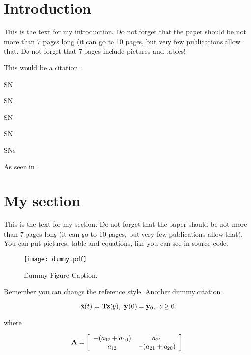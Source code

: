 \section{Introduction}

This is the text for my introduction. Do not forget that the paper should be not more than 7 pages long (it can go to 10 pages, but very few publications allow that. Do not forget that 7 pages include pictures and tables!

This would be a citation \cite{dummy}.

\ac{SN} 

\acf{SN}

\acs{SN}

\acl{SN}

\acp{SN}

As seen in \cite{wiki}.

\section{My section}

This is the text for my section. Do not forget that the paper should be not more than 7 pages long (it can go to 10 pages, but very few publications allow that). You can put pictures, table and equations, like you can see in source code.

\begin{figure}[H]
	\centering
		\texttt{[image: dummy.pdf]}
	\caption[Dummy Figure Caption for List of Figures.]{Dummy Figure Caption.}
	\label{fig:dummyfigure1}
\end{figure}

Remember you can change the reference style. Another dummy citation \cite{site}.

\begin{equation}
\dot{\mathbf{x}}(t) = \mathbf{T}\mathbf{z}(y),\  \mathbf{y}(0) = \mathbf{y}_0,\  z\geq 0 \\
\label{eq:dummyeq1}
\end{equation}

\noindent where

\begin{equation}
\mathbf{A} = \left[ \begin{array}{cc} -(a_{12} + a_{10}) & a_{21} \\ a_{12} & -(a_{21} + a_{20}) \end{array} \right]\\
\label{eq:dummyeq2}
\end{equation}

